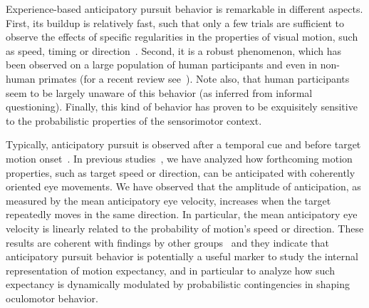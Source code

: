 \documentclass[10pt,letterpaper]{article}
\newcommand{\citep}[1]{\cite{#1}}
\newcommand{\citet}[1]{\cite{#1}}
\newcommand{\seeFig}[1]{Figure~\ref{fig:#1}}
\begin{document}
Experience-based anticipatory pursuit behavior is remarkable
in different aspects.
First, its buildup is relatively fast, such that only a few trials are sufficient
to observe the effects of specific regularities in the properties of visual motion, such as speed, timing or direction~\citep{Kowler1984,Maus2015,Deravet_JOV2018}.
Second, it is a robust phenomenon, which has been observed on a large population of human participants and even in non-human primates (for a recent review see~\citet{Kowler_AnnRev2019}). Note also, that human participants seem to be largely unaware of this behavior (as inferred from informal questioning). Finally, this kind of behavior has proven to be exquisitely sensitive to the probabilistic properties of the sensorimotor context.

Typically, anticipatory pursuit is observed after a temporal cue and
before target motion onset~\citep{Kowler1979a,Kowler1979b, Kowler1984}. %
In previous studies~\citep{Montagnini2010,Damasse18},
we have analyzed how forthcoming motion properties,
such as target speed or direction, can be anticipated with coherently oriented eye movements. %
We have observed that the amplitude of anticipation,
as measured by the mean anticipatory eye velocity,
increases when the target repeatedly moves in the same direction.
In particular, the mean anticipatory eye velocity is linearly related
to the probability of motion's speed or direction. %
These results are coherent with findings
by other groups~\citep{Kowler1984, Kowler1989, Heinen2005,SantosKowler2017} and
they indicate that anticipatory pursuit behavior is potentially a useful marker
to study the internal representation of motion expectancy, %
and in particular to analyze how such expectancy
is dynamically modulated by probabilistic contingencies in shaping oculomotor behavior.
%
\end{document}
